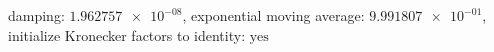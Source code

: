 damping: $\num[scientific-notation=true]{1.962757e-08}$, exponential moving average: $\num[scientific-notation=true]{9.991807e-01}$, initialize Kronecker factors to identity: $\text{yes}$